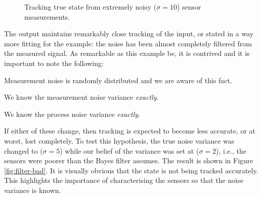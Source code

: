 \begin{figure}[h]
\centering
{}
\caption{Tracking true state from extremely noisy ($\sigma = 10$)
sensor measurements.}
\label{fig:filter}
\end{figure}

The output maintains remarkably close tracking of the input, or stated in a
way more fitting for the example: the noise has been almost completely filtered
from the measured signal. As remarkable as this example be, it is contrived and
it is important to note the following:
\begin{compactitem}
\item Measurement noise is randomly distributed and we are aware of this fact.
\item We know the measurement noise variance \emph{exactly}.
\item We know the process noise variance \emph{exactly}.
\end{compactitem}
If either of these change, then tracking is expected to become less accurate, or
at worst, lost completely. To test this hypothesis, the true noise variance was
changed to ($\sigma = 5$) while our belief of the variance was set at
($\sigma = 2$), i.e., the sensors were poorer than the Bayes filter assumes.
The result is shown in Figure \ref{fig:filter-bad}. It is
visually obvious that the state is not being tracked accurately. This highlights
the importance of characterising the sensors so that the noise variance is
known.

